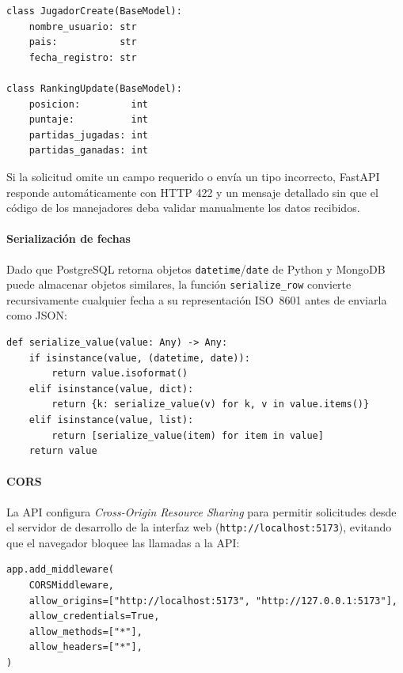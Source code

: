 \documentclass[12pt,letterpaper]{article}
\begin{document}
\begin{lstlisting}[style=pycode, caption={Modelos de validación en \texttt{api/schemas.py}}]
class JugadorCreate(BaseModel):
    nombre_usuario: str
    pais:           str
    fecha_registro: str

class RankingUpdate(BaseModel):
    posicion:         int
    puntaje:          int
    partidas_jugadas: int
    partidas_ganadas: int
\end{lstlisting}

Si la solicitud omite un campo requerido o envía un tipo incorrecto, FastAPI responde
automáticamente con HTTP 422 y un mensaje detallado sin que el código de los manejadores
deba validar manualmente los datos recibidos.

\paragraph{Serialización de fechas}

Dado que PostgreSQL retorna objetos \texttt{datetime}/\texttt{date} de Python y MongoDB puede
almacenar objetos similares, la función \texttt{serialize\_row} convierte recursivamente
cualquier fecha a su representación ISO~8601 antes de enviarla como JSON:

\begin{lstlisting}[style=pycode, caption={Serialización de fechas en \texttt{serialize\_value}}]
def serialize_value(value: Any) -> Any:
    if isinstance(value, (datetime, date)):
        return value.isoformat()
    elif isinstance(value, dict):
        return {k: serialize_value(v) for k, v in value.items()}
    elif isinstance(value, list):
        return [serialize_value(item) for item in value]
    return value
\end{lstlisting}

\paragraph{CORS}

La API configura \textit{Cross-Origin Resource Sharing} para permitir solicitudes desde el
servidor de desarrollo de la interfaz web (\texttt{http://localhost:5173}), evitando
que el navegador bloquee las llamadas a la API:

\begin{lstlisting}[style=pycode, caption={Configuración de CORS en \texttt{api/main.py}}]
app.add_middleware(
    CORSMiddleware,
    allow_origins=["http://localhost:5173", "http://127.0.0.1:5173"],
    allow_credentials=True,
    allow_methods=["*"],
    allow_headers=["*"],
)
\end{lstlisting}
\end{document}
